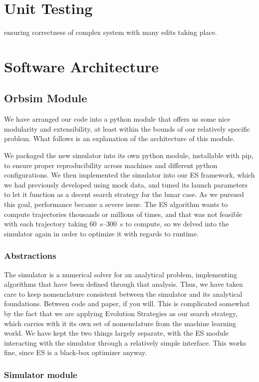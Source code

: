 \section{Unit Testing} \label{sec:unit-testing}
ensuring correctness of complex system with many edits taking place.
\section{Software Architecture}
\subsection{Orbsim Module}
We have arranged our code into a python module that offers us some nice modularity and extensibility, at least within the bounds of our relatively specific problem. What follows is an explanation of the architecture of this module.

We packaged the new simulator into its own python module, installable with pip, to ensure proper reproducibility across machines and different python configurations. We then implemented the simulator into our ES framework, which we had previously developed using mock data, and tuned its launch parameters to let it function as a decent search strategy for the lunar case. As we pursued this goal, performance became a severe issue. The ES algorithm wants to compute trajectories thousands or millions of times, and that was not feasible with each trajectory taking \SIrange{60}{300}{\second} to compute, so we delved into the simulator again in order to optimize it with regards to runtime.

\subsubsection{Abstractions}

The simulator is a numerical solver for an analytical problem, implementing algorithms that have been defined through that analysis. Thus, we have taken care to keep nomenclature consistent between the simulator and its analytical foundations. Between code and paper, if you will. This is complicated somewhat by the fact that we are applying Evolution Strategies as our search strategy, which carries with it its own set of nomenclature from the machine learning world. We have kept the two things largely separate, with the ES module interacting with the simulator through a relatively simple interface. This works fine, since ES is a black-box optimizer anyway.

\subsubsection{Simulator module}

